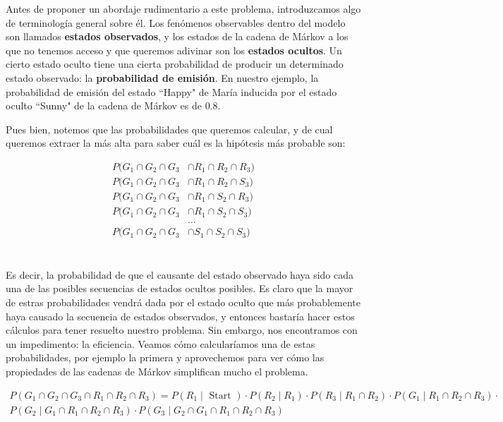 \documentclass{article}
\begin{document}
Antes de proponer un abordaje rudimentario a este problema,
introduzcamos algo de terminología general sobre él.
Los fenómenos observables dentro del modelo son llamados \textbf{estados observados}, y los estados de la cadena de Márkov a los
que no tenemos acceso y que queremos adivinar son los \textbf{estados ocultos}. Un cierto estado oculto tiene una cierta
probabilidad de producir un determinado estado observado: la \textbf{probabilidad de emisión}. En nuestro ejemplo, la probabilidad de emisión del estado ``Happy" de María inducida por el 
estado oculto ``Sunny" de la cadena de Márkov es de $0.8$.

\medskip

Pues bien, notemos que las probabilidades que queremos calcular,
y de cual queremos extraer la más alta para saber cuál es la
hipótesis más probable son:

\begin{align*}
    P(G_1 \cap  G_2 \cap G_3 &\cap R_1 \cap  R_2 \cap R_3) \\
    P(G_1 \cap G_2 \cap G_3 &\cap R_1 \cap R_2 \cap S_3) \\
    P(G_1 \cap G_2 \cap G_3 &\cap R_1 \cap S_2 \cap R_3) \\
    P(G_1 \cap G_2 \cap G_3 &\cap R_1 \cap S_2 \cap S_3) \\
			    &\ldots \\
    P(G_1 \cap G_2 \cap G_3 &\cap S_1 \cap S_2 \cap S_3) \\
\end{align*} 

\\

Es decir, la probabilidad de que el causante del estado
observado haya sido cada una de las posibles secuencias de
estados ocultos posibles. Es claro que la mayor de estras probabilidades vendrá dada por el estado oculto que más probablemente
haya causado la secuencia de estados observados, y entonces
bastaría hacer estos cálculos para tener resuelto nuestro 
problema.
Sin embargo, nos encontramos con un impedimento: la eficiencia.
Veamos cómo calcularíamos una de estas probabilidades, por ejemplo la primera y aprovechemos para ver cómo las propiedades
de las cadenas de Márkov simplifican mucho el problema.

\begin{multline*}
    P(G_1 \cap  G_2 \cap G_3 \cap R_1 \cap  R_2 \cap R_3) = P(R_1 \mid \text{ Start }) \cdot  P(R_2  \mid R_1) \cdot  P(R_3  \mid  R_1 \cap R_2) \cdot P(G_1  \mid R_1 \cap R_2 \cap R_3)  
    \cdot \\ P(  G_2 \mid  G_1  \cap  R_1 \cap R_2 \cap R_3) \cdot P(  G_3 \mid  G_2 \cap G_1  \cap  R_1 \cap R_2 \cap R_3) 
\end{multline*} 
\end{document}
